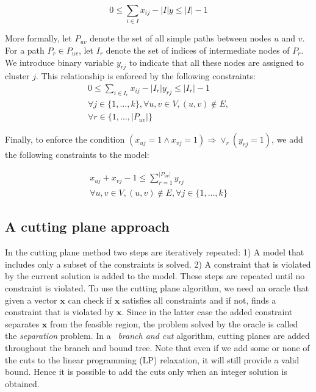 \documentclass[conference]{IEEEtran}
\begin{document}
\begin{equation*}
0 \leq \sum_{i \in I} x_{ij} - |I|y \leq |I|-1
\end{equation*}

More formally, let $P_{uv}$ denote the set of all simple paths between nodes $u$ and $v$. For a path $P_r \in P_{uv}$, let $I_r$ denote the set of indices of intermediate nodes of $P_r$. We introduce binary variable $y_{rj}$ to indicate that all these nodes are assigned to cluster $j$. This relationship is enforced by the following constraints:
\begin{multline}
0 \leq \sum_{i\in I_r} x_{ij} - |I_r| y_{rj} \leq |I_r| - 1 \\
\forall j \in \{1, \ldots, k\}, \forall u, v \in V, (u, v) \notin E, \\ \forall r \in \{1, \ldots, |P_{uv}|\}
\label{cons:path}
\end{multline}

Finally, to enforce the condition $(x_{uj}=1 \land x_{vj}=1) \Rightarrow \lor_{r} (y_{rj}=1)$, we add the following constraints to the model:

\begin{multline}
x_{uj} + x_{vj} -1 \leq \sum_{r=1}^{|P_{uv}|} y_{rj} \\
\forall u, v \in V, (u, v) \notin E, \forall j \in \{1, \ldots, k\}
\label{cons:pconnect}
\end{multline}

\subsection{A cutting plane approach}
\label{sec:bnc}

 In the cutting plane method two steps are iteratively repeated: 1) A model that includes only a subset of the constraints is solved. 2) A constraint that is violated by the current solution is added to the model. These steps are repeated until no constraint is violated. To use the cutting plane algorithm, we need an oracle that given a vector $\mathbf{x}$ can check if $\mathbf{x}$ satisfies all constraints and if not, finds a constraint that is violated by $\mathbf{x}$. Since in the latter case the added constraint separates $\mathbf{x}$ from the feasible region, the problem solved by the oracle is called the \emph{separation} problem. In a ~\emph{branch and cut} algorithm, cutting planes are added throughout the branch and bound tree. Note that even if we add some or none of the cuts to the linear programming (LP) relaxation, it will still provide a valid bound. Hence it is possible to add the cuts only when an integer solution is obtained.
\end{document}
